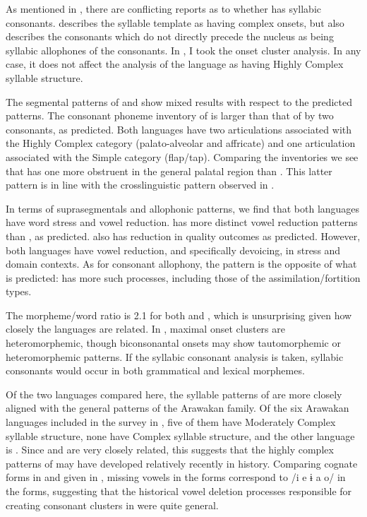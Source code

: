   As mentioned in , there are conflicting reports as to whether  has syllabic consonants. \citet{Matteson1965} describes the syllable template as having complex onsets, but also describes the consonants which do not directly precede the nucleus as being syllabic allophones of the consonants. In , I took the onset cluster analysis. In any case, it does not affect the analysis of the language as having Highly Complex syllable structure.

  The segmental patterns of  and  show mixed results with respect to the predicted patterns. The consonant phoneme inventory of  is larger than that of  by two consonants, as predicted. Both languages have two articulations associated with the Highly Complex category (palato-alveolar and affricate) and one articulation associated with the Simple category (flap/tap). Comparing the inventories we see that  has one more obstruent in the general palatal region than . This latter pattern is in line with the crosslinguistic pattern observed in .

  In terms of suprasegmentals and allophonic patterns, we find that both languages have word stress and vowel reduction.  has more distinct vowel reduction patterns than , as predicted.  also has reduction in quality outcomes as predicted. However, both languages have vowel reduction, and specifically devoicing, in stress and domain contexts. As for consonant allophony, the pattern is the opposite of what is predicted:  has more such processes, including those of the assimilation/fortition types.

  The morpheme/word ratio is 2.1 for both  and , which is unsurprising given how closely the languages are related. In , maximal onset clusters are heteromorphemic, though biconsonantal onsets may show tautomorphemic or heteromorphemic patterns. If the syllabic consonant analysis is taken, syllabic consonants would occur in both grammatical and lexical morphemes.

  Of the two languages compared here, the syllable patterns of  are more closely aligned with the general patterns of the Arawakan family. Of the six Arawakan languages included in the survey in \citet{Maddieson2013a}, five of them have Moderately Complex syllable structure, none have Complex syllable structure, and the other language is . Since  and  are very closely related, this suggests that the highly complex patterns of  may have developed relatively recently in history. Comparing cognate forms in  and  given in \citet[88--89]{Facundes2002}, missing vowels in the  forms correspond to /i e ɨ a o/ in the  forms, suggesting that the historical vowel deletion processes responsible for creating consonant clusters in  were quite general.


